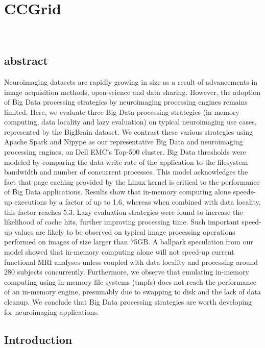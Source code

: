 \chapter{CCGrid}~\label{chp:bigdatastrategies}

\section{abstract}
    Neuroimaging datasets are rapidly growing in size as a result of 
    advancements in image acquisition methods, open-science and data sharing. 
    However, the adoption of Big Data processing strategies by neuroimaging
    processing engines remains limited. Here, we 
    evaluate three Big Data processing strategies (in-memory computing, 
    data locality and lazy evaluation) on typical neuroimaging use 
    cases, represented by the BigBrain dataset. We contrast these various 
    strategies using Apache Spark and Nipype as our 
    representative Big Data and neuroimaging processing engines, on Dell EMC's 
    Top-500 cluster. 
    Big Data thresholds were modeled by comparing the data-write rate of the 
    application to the filesystem bandwidth and number of concurrent processes. 
    This model acknowledges the 
fact that page caching provided by the Linux kernel is critical to the 
performance of Big Data applications. Results show that in-memory 
computing alone speeds-up executions by a factor of up to 1.6, whereas 
when combined with data locality, this factor reaches 5.3. Lazy evaluation
strategies
were found to increase the likelihood of cache hits, further improving
    processing time. Such important 
speed-up values are likely to be observed on typical image processing 
operations performed on images of size larger than 75GB. A ballpark 
speculation from our model showed that in-memory computing alone will
not speed-up current 
functional MRI analyses unless coupled with data 
locality and processing around 280 subjects concurrently. Furthermore, we observe
    that emulating in-memory computing 
using in-memory file systems (tmpfs) does not reach the performance of an in-memory engine,
    presumably due to swapping to disk and the lack of data cleanup.
We conclude that Big Data processing strategies are 
worth developing for neuroimaging 
applications. 

\section{Introduction} %

